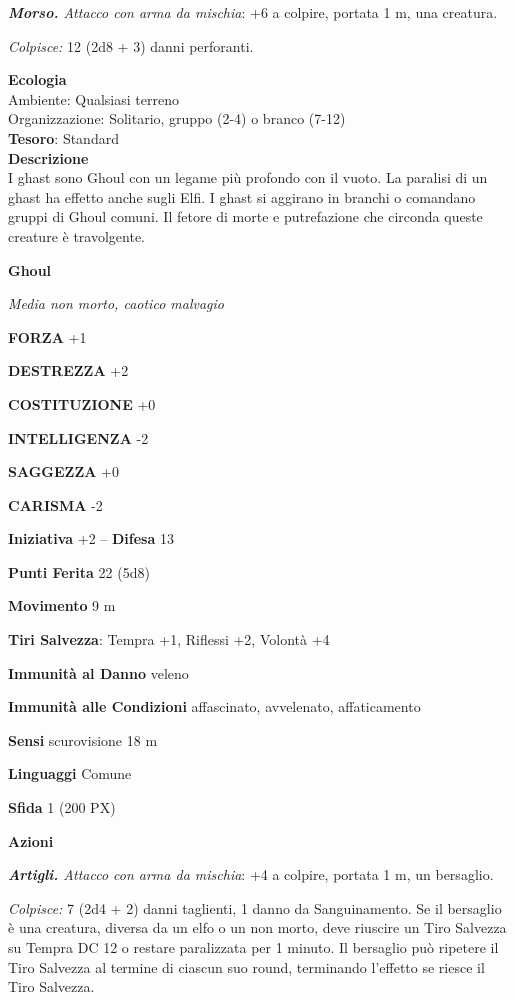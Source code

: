 \begin{multicols}{2}
	\textit{\textbf{Morso.} Attacco con arma da mischia}: +6 a colpire, portata 1 m, una creatura.

	\textit{Colpisce:} 12 (2d8 + 3) danni perforanti.

	\textbf{Ecologia}\\
	Ambiente: Qualsiasi terreno\\
	Organizzazione: Solitario, gruppo (2-4) o branco (7-12)\\
	\textbf{Tesoro}: Standard\\
	\textbf{Descrizione}\\
	I ghast sono Ghoul con un legame più profondo con il vuoto. La paralisi di un ghast ha effetto anche sugli Elfi. I ghast si aggirano in branchi o comandano gruppi di Ghoul comuni. Il fetore di morte e putrefazione che circonda queste creature è travolgente.


	\medskip{}\textbf{Ghoul}

	\textit{Media non morto, caotico malvagio}

	\textbf{FORZA} +1

	\textbf{DESTREZZA} +2

	\textbf{COSTITUZIONE} +0

	\textbf{INTELLIGENZA} -2

	\textbf{SAGGEZZA} +0

	\textbf{CARISMA} -2

	\textbf{Iniziativa} +2 -- \textbf{Difesa} 13

	\textbf{Punti Ferita} 22 (5d8)

	\textbf{Movimento} 9 m

	\textbf{Tiri Salvezza}: Tempra +1, Riflessi +2, Volontà +4

	\textbf{Immunità al Danno} veleno

	\textbf{Immunità alle Condizioni} affascinato, avvelenato, affaticamento

	\textbf{Sensi} scurovisione 18 m

	\textbf{Linguaggi} Comune

	\textbf{Sfida} 1 (200 PX)

	\textbf{Azioni}

	\textit{\textbf{Artigli.} Attacco con arma da mischia}: +4 a colpire, portata 1 m, un bersaglio.

	\textit{Colpisce:} 7 (2d4 + 2) danni taglienti, 1 danno da Sanguinamento. Se il bersaglio è una creatura, diversa da un elfo o un non morto, deve riuscire un Tiro Salvezza su Tempra DC 12 o restare paralizzata per 1 minuto. Il bersaglio può ripetere il Tiro Salvezza al termine di ciascun suo round, terminando l'effetto se riesce il Tiro Salvezza.


\end{multicols}
